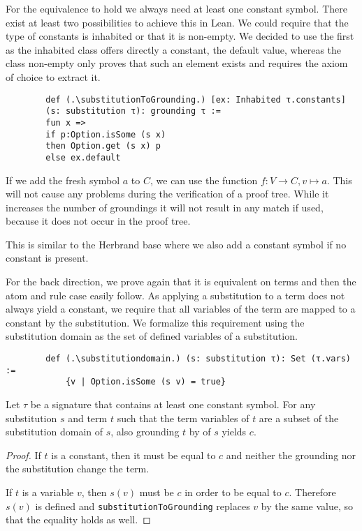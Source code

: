     For the equivalence to hold we always need at least one constant symbol. There exist at least two possibilities to achieve this in Lean. We could require that the type of constants is inhabited or that it is non-empty. We decided to use the first as the inhabited class offers directly a constant, the default value, whereas the class non-empty only proves that such an element exists and requires the axiom of choice to extract it.

    \begin{lstlisting}
        def (.\substitutionToGrounding.) [ex: Inhabited τ.constants] 
        (s: substitution τ): grounding τ :=
        fun x => 
        if p:Option.isSome (s x) 
        then Option.get (s x) p 
        else ex.default
    \end{lstlisting}

    \begin{contexample}
        If we add the fresh symbol $a$ to $C$, we can use the function $f: V \to C, v \mapsto a$. This will not cause any problems during the verification of a proof tree. While it increases the number of groundings it will not result in any match if used, because it does not occur in the proof tree.
    \end{contexample}

    This is similar to the Herbrand base where we also add a constant symbol if no constant is present.

    For the back direction, we prove again that it is equivalent on terms and then the atom and rule case easily follow. As applying a substitution to a term does not always yield a constant, we require that all variables of the term are mapped to a constant by the substitution. We formalize this requirement using the substitution domain as the set of defined variables of a substitution.

    \begin{lstlisting}
        def (.\substitutiondomain.) (s: substitution τ): Set (τ.vars) := 
            {v | Option.isSome (s v) = true}
    \end{lstlisting}
    
    

    \begin{lemma}[\substitutionToGroundingEquivTerm]
        Let $\tau$ be a signature that contains at least one constant symbol. For any substitution $s$ and term $t$ such that the term variables of $t$ are a subset of the substitution domain of $s$, also grounding $t$ by \substitutionToGrounding of $s$ yields $c$.
    \end{lemma}
    \begin{proof}
        If $t$ is a constant, then it must be equal to $c$ and neither the grounding nor the substitution change the term.

        If $t$ is a variable $v$, then $s(v)$ must be $c$ in order to be equal to $c$. Therefore $s(v)$ is defined and \lstinline|substitutionToGrounding| replaces $v$ by the same value, so that the equality holds as well.
    \end{proof}

